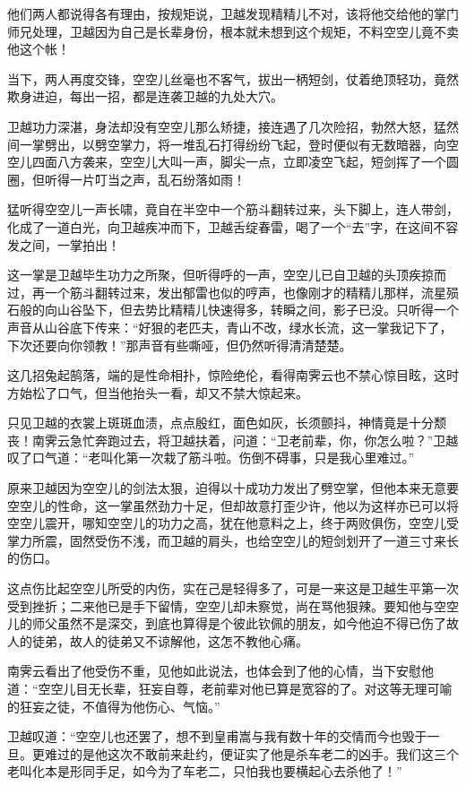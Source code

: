 \documentclass[12pt,oneside]{book}
\begin{document}
他们两人都说得各有理由，按规矩说，卫越发现精精儿不对，该将他交给他的掌门师兄处理，卫越因为自己是长辈身份，根本就未想到这个规矩，不料空空儿竟不卖他这个帐！

当下，两人再度交锋，空空儿丝毫也不客气，拔出一柄短剑，仗着绝顶轻功，竟然欺身进迫，每出一招，都是连袭卫越的九处大穴。

卫越功力深湛，身法却没有空空儿那么矫捷，接连遇了几次险招，勃然大怒，猛然间一掌劈出，以劈空掌力，将一堆乱石打得纷纷飞起，登时便似有无数暗器，向空空儿四面八方袭来，空空儿大叫一声，脚尖一点，立即凌空飞起，短剑挥了一个圆圈，但听得一片叮当之声，乱石纷落如雨！

猛听得空空儿一声长啸，竟自在半空中一个筋斗翻转过来，头下脚上，连人带剑，化成了一道白光，向卫越疾冲而下，卫越舌绽春雷，喝了一个``去''字，在这间不容发之间，一掌拍出！

这一掌是卫越毕生功力之所聚，但听得呼的一声，空空儿已自卫越的头顶疾掠而过，再一个筋斗翻转过来，发出郁雷也似的哼声，也像刚才的精精儿那样，流星殒石般的向山谷坠下，但去势比精精儿快速得多，转瞬之间，影子已没。只听得一个声音从山谷底下传来：``好狠的老匹夫，青山不改，绿水长流，这一掌我记下了，下次还要向你领教！''那声音有些嘶哑，但仍然听得清清楚楚。

这几招兔起鹄落，端的是性命相扑，惊险绝伦，看得南霁云也不禁心惊目眩，这时方始松了口气，但当他抬头一看，却又不禁大惊起来。

只见卫越的衣裳上斑斑血渍，点点殷红，面色如灰，长须颤抖，神情竟是十分颓丧！南霁云急忙奔跑过去，将卫越扶着，问道：``卫老前辈，你，你怎么啦？''卫越叹了口气道：``老叫化第一次栽了筋斗啦。伤倒不碍事，只是我心里难过。''

原来卫越因为空空儿的剑法太狠，迫得以十成功力发出了劈空掌，但他本来无意要空空儿的性命，这一掌虽然劲力十足，但却故意打歪少许，他以为这样亦已可以将空空儿震开，哪知空空儿的功力之高，犹在他意料之上，终于两败俱伤，空空儿受掌力所震，固然受伤不浅，而卫越的肩头，也给空空儿的短剑划开了一道三寸来长的伤口。

这点伤比起空空儿所受的内伤，实在己是轻得多了，可是一来这是卫越生平第一次受到挫折；二来他已是手下留情，空空儿却未察觉，尚在骂他狠辣。要知他与空空儿的师父虽然不是深交，到底也算得是个彼此钦佩的朋友，如今他迫不得已伤了故人的徒弟，故人的徒弟又不谅解他，这怎不教他心痛。

南霁云看出了他受伤不重，见他如此说法，也体会到了他的心情，当下安慰他道：``空空儿目无长辈，狂妄自尊，老前辈对他已算是宽容的了。对这等无理可喻的狂妄之徒，不值得为他伤心、气恼。''

卫越叹道：``空空儿也还罢了，想不到皇甫嵩与我有数十年的交情而今也毁于一旦。更难过的是他这次不敢前来赴约，便证实了他是杀车老二的凶手。我们这三个老叫化本是形同手足，如今为了车老二，只怕我也要横起心去杀他了！''
\end{document}
